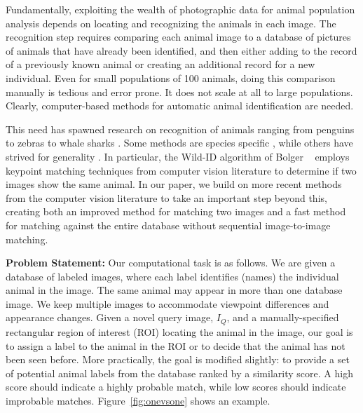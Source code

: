 Fundamentally, exploiting the wealth of photographic data for animal
population analysis depends on locating and recognizing the animals in
each image.  The recognition step requires comparing each animal image
to a database of pictures of animals that have already been
identified, and then either adding to the record of a
previously known animal or creating an additional record for a new
individual.  Even for small populations of 100 animals,
doing this comparison manually is tedious and error prone.  It does
not scale at all to large populations.
Clearly, computer-based methods for automatic animal identification %
are needed.

This need has spawned research on recognition of
animals ranging from penguins to zebras to whale sharks \cite{ipc10SherleyCVPenguin, jae05HolmbergAstroWhaleShark}.  Some methods
are species specific \cite{si04BradfieldFrogPhoto, aje09ShorrocksNeckNet, icmr11LahiriStripeSpotter},
while others have strived for generality \cite{fiz07SpeedSpotMatch, 11BoldgerWILDID}.
In particular, the Wild-ID algorithm of Bolger \etal~\cite{11BoldgerWILDID} employs
keypoint matching techniques
from computer vision literature \cite{ijcv04LoweSIFT} to
determine if two images show the same
animal. In our paper, we build on more recent methods from the computer %
vision literature to take an important step beyond this, creating both
an improved method for matching two images
and a fast method for matching against the entire database
without sequential image-to-image matching. %

\textbf{Problem Statement:} Our computational task is as follows.  We
are given a database of labeled images, where each label identifies
(names) the individual animal in the image. The same animal may
appear in more than one database image. We keep multiple images to
accommodate viewpoint differences and appearance changes.  Given
a novel query image, $I_Q$, and a
manually-specified rectangular region of interest (ROI) locating the
animal in the image, our goal is to
assign a label to the animal in the ROI or to decide that the animal has
not been seen before.  More practically, the goal is modified
slightly: to provide a set of potential animal labels from the
database ranked by a similarity score.
A high score should indicate a highly probable match,
while low scores should indicate improbable matches.
Figure~\ref{fig:onevsone} shows an example.

